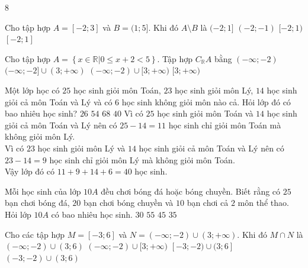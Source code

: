 \begin{indapan}{8}
\begin{ex}%
	Cho tập hợp $ A=[-2;3] $ và $ B=(1;5] $. Khi đó $ A\setminus B $ là
	\choice
	{$(-2;1]$}
	{$(-2;-1)$}
	{$[-2;1) $}
	{\True $[-2;1]$}
	\loigiai{
		Ta có $ A\setminus B =[-2;3]\setminus(1;5]= [-2;1]$. 
	}
\end{ex}

 \begin{ex}%
 	Cho tập hợp $A=\left\{x \in \mathbb{R} |  0 \le x+2 <5 \right\}$. Tập hợp $C_{\mathbb{R}}A$ bằng
 	\choice
 	{$(-\infty;-2)$}
 	{$(-\infty;-2] \cup (3;+\infty)$}
 	{\True $(-\infty;-2) \cup [3;+\infty)$}
 	{$[3;+\infty)$}
 	\loigiai{
 		Ta có: $C_{\mathbb{R}}A=(-\infty;-2) \cup [3;+\infty)$.}
 \end{ex}
\begin{ex}%
	Một lớp học có $25$ học sinh giỏi môn Toán, $23$ học sinh giỏi môn Lý, $14$ học sinh giỏi cả môn Toán và Lý và có $6$ học sinh không giỏi môn nào cả. Hỏi lớp đó có bao nhiêu học sinh?
	\choice
	{$26$}
	{$54$}
	{$68$}
	{\True $40$}
	\loigiai
	{
		Vì có $25$ học sinh giỏi môn Toán và $14$ học sinh giỏi cả môn Toán và Lý nên có $25-14=11$ học sinh chỉ giỏi môn Toán mà không giỏi môn Lý. \\
		Vì có $23$ học sinh giỏi môn Lý và $14$ học sinh giỏi cả môn Toán và Lý nên có $23-14=9$ học sinh chỉ giỏi môn Lý mà không giỏi môn Toán. \\
		Vậy lớp đó có $11+9+14+6=40$ học sinh.
	}
\end{ex}
\begin{ex}%
	Mỗi học sinh của lớp $10A$ đều chơi bóng đá hoặc bóng chuyền. Biết rằng có $25$ bạn chơi bóng đá, $20$ bạn chơi bóng chuyền và $10$ bạn chơi cả $2$ môn thể thao. Hỏi lớp $10A$ có bao nhiêu học sinh.
	\choice
	{$30$}
	{$55$}
	{$45$}
	{\True $35$}
\end{ex}
\begin{ex}%
	Cho các tập hợp $M=[-3;6]$ và $N=(-\infty; -2)\cup (3;+\infty)$. Khi đó $M\cap N$ là
	\choice
	{$(-\infty;-2)\cup (3;6)$}
	{$(-\infty;-2)\cup [3;+\infty)$}
	{\True $[-3;-2)\cup (3;6]$}
	{$(-3;-2)\cup (3;6)$}
\end{ex}


\end{indapan}
